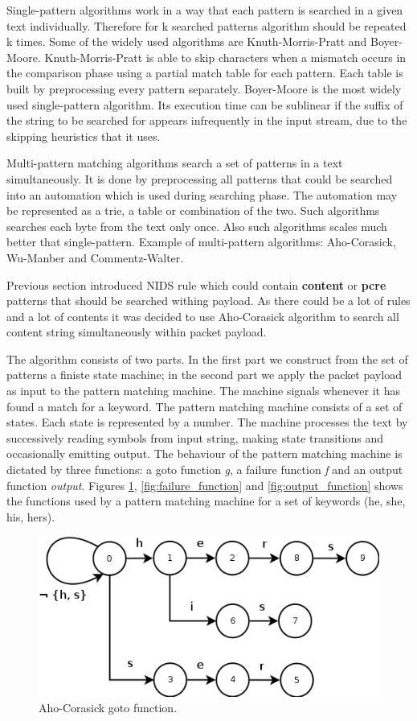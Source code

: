 \documentclass[thesis=M,english]{FITthesis}[2011/07/15]
\begin{document}
Single-pattern algorithms work in a way that each pattern is searched in a given text individually. Therefore for k searched patterns algorithm should be repeated k times. Some of the widely used algorithms are Knuth-Morris-Pratt and Boyer-Moore. Knuth-Morris-Pratt is able to skip characters when a mismatch occurs in the comparison phase using a partial match table for each pattern. Each table is built by preprocessing every pattern separately. Boyer-Moore is the most widely used single-pattern algorithm. Its execution time can be sublinear if the suffix of the string to be searched for appears infrequently in the input stream, due to the skipping heuristics that it uses.

Multi-pattern matching algorithms search a set of patterns in a text simultaneously. It is done by preprocessing all patterns that could be searched into an automation which is used during searching phase. The automation may be represented as a trie, a table or combination of the two. Such algorithms searches each byte from the text only once. Also such algorithms scales much better that single-pattern. Example of multi-pattern algorithms: Aho-Corasick, Wu-Manber and Commentz-Walter.

Previous section introduced NIDS rule which could contain \textbf{content} or \textbf{pcre} patterns that should be searched withing payload. As there could be a lot of rules and a lot of contents it was decided to use Aho-Corasick algorithm to search all content string simultaneously within packet payload. 

The algorithm consists of two parts. In the first part we construct from the set of patterns a finiste state machine; in the second part we apply the packet payload as input to the pattern matching machine. The machine signals whenever it has found a match for a keyword. The pattern matching machine consists of a set of states. Each state is represented by a number. The machine processes the text by successively reading symbols from input string, making state transitions and occasionally emitting output. The behaviour of the pattern matching machine is dictated by three functions: a goto function \emph{g}, a failure function \emph{f} and an output function \emph{output}. Figures \ref{fig:goto_function}, \ref{fig:failure_function} and \ref{fig:output_function} shows the functions used by a pattern matching machine for a set of keywords (he, she, his, hers).

\begin{figure}[h]
\centering
\includegraphics[scale=0.5]{images/goto_function.png}
\caption{Aho-Corasick goto function.}
\label{fig:goto_function}
\end{figure}
\end{document}
